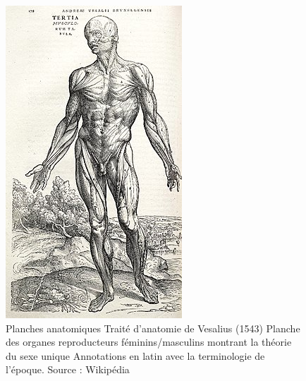 \documentclass[
  letterpaper,
  DIV=11,
  numbers=noendperiod]{scrreprt}
\begin{document}
\begin{figure}[H]

{\centering \includegraphics{images/clipboard-1755216688.png}

}

\caption{Planches anatomiques Traité d'anatomie de Vesalius (1543)
Planche des organes reproducteurs féminins/masculins montrant la théorie
du sexe unique Annotations en latin avec la terminologie de l'époque.
Source : Wikipédia}

\end{figure}%
\end{document}
